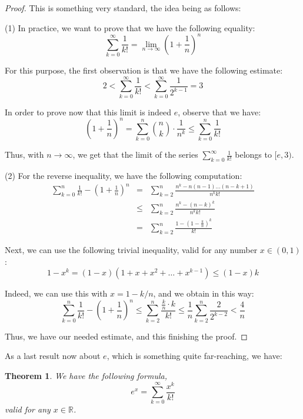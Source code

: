 \documentclass[12pt]{amsbook}
\newtheorem{theorem}{Theorem}[chapter]
\begin{document}
\begin{proof}
This is something very standard, the idea being as follows:

\medskip

(1) In practice, we want to prove that we have the following equality:
$$\sum_{k=0}^\infty\frac{1}{k!}=\lim_{n\to\infty}\left(1+\frac{1}{n}\right)^n$$

For this purpose, the first observation is that we have the following estimate:
$$2<\sum_{k=0}^\infty\frac{1}{k!}<\sum_{k=0}^\infty\frac{1}{2^{k-1}}=3$$

In order to prove now that this limit is indeed $e$, observe that we have:
$$\left(1+\frac{1}{n}\right)^n
=\sum_{k=0}^n\binom{n}{k}\cdot\frac{1}{n^k}
\leq\sum_{k=0}^n\frac{1}{k!}$$

Thus, with $n\to\infty$, we get that the limit of the series $\sum_{k=0}^\infty\frac{1}{k!}$ belongs to $[e,3)$.

\medskip

(2) For the reverse inequality, we have the following computation:
\begin{eqnarray*}
\sum_{k=0}^n\frac{1}{k!}-\left(1+\frac{1}{n}\right)^n
&=&\sum_{k=2}^n\frac{n^k-n(n-1)\ldots(n-k+1)}{n^kk!}\\
&\leq&\sum_{k=2}^n\frac{n^k-(n-k)^k}{n^kk!}\\
&=&\sum_{k=2}^n\frac{1-\left(1-\frac{k}{n}\right)^k}{k!}
\end{eqnarray*}

Next, we can use the following trivial inequality, valid for any number $x\in(0,1)$:
$$1-x^k=(1-x)(1+x+x^2+\ldots+x^{k-1})\leq(1-x)k$$

Indeed, we can use this with $x=1-k/n$, and we obtain in this way:
$$\sum_{k=0}^n\frac{1}{k!}-\left(1+\frac{1}{n}\right)^n
\leq\sum_{k=2}^n\frac{\frac{k}{n}\cdot k}{k!}
\leq\frac{1}{n}\sum_{k=2}^n\frac{2}{2^{k-2}}
<\frac{4}{n}$$

Thus, we have our needed estimate, and this finishing the proof.
\end{proof}

As a last result now about $e$, which is something quite far-reaching, we have:

\begin{theorem}
We have the following formula,
$$e^x=\sum_{k=0}^\infty\frac{x^k}{k!}$$
valid for any $x\in\mathbb R$.
\end{theorem}
\end{document}

